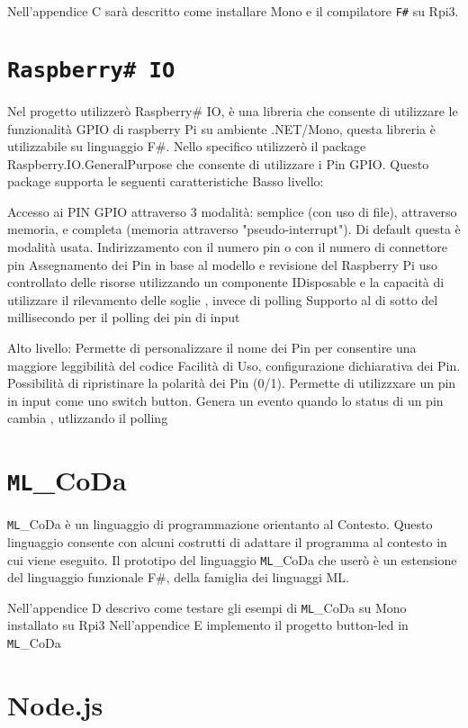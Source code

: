 Nell'appendice C sarà  descritto come installare Mono e il compilatore \texttt{F\#} su Rpi3.

\section{\texttt{Raspberry\# IO}}
Nel progetto utilizzerò Raspberry# IO, è una libreria che consente di utilizzare le funzionalità GPIO di raspberry Pi su ambiente .NET/Mono, questa libreria è utilizzabile su linguaggio F#.
Nello specifico utilizzerò il package Raspberry.IO.GeneralPurpose che consente di utilizzare i Pin GPIO.
Questo package supporta le seguenti caratteristiche
Basso livello:

Accesso ai PIN GPIO attraverso 3 modalità: 
semplice (con uso di file), 
attraverso memoria, e 
completa (memoria attraverso "pseudo-interrupt"). Di default questa è modalità usata.
	Indirizzamento con il numero pin o con il numero di connettore pin
	Assegnamento dei Pin in base al modello e revisione del Raspberry Pi
	uso controllato delle risorse utilizzando un componente IDisposable e la capacità di utilizzare il rilevamento delle soglie , invece di polling
	Supporto al di sotto del millisecondo per il polling dei pin di input

Alto livello:
	Permette di personalizzare il nome dei Pin per consentire una maggiore leggibilità del codice
	Facilità di Uso, configurazione dichiarativa  dei Pin. Possibilità di ripristinare la polarità dei Pin (0/1). Permette di utilizzxare un pin in input come uno switch button.  
	Genera un evento quando lo status di un pin cambia , utlizzando il polling


\section{\texttt{ML}_{CoDa}}
 \texttt{ML}_{CoDa} è un linguaggio di programmazione orientanto al Contesto. Questo linguaggio consente con alcuni costrutti di adattare il programma al contesto in cui viene eseguito. Il prototipo del linguaggio \texttt{ML}_{CoDa} che userò è un estensione del linguaggio funzionale F#, della famiglia dei linguaggi ML.
 
 
 Nell'appendice D descrivo come testare gli esempi di \texttt{ML}_{CoDa} su Mono installato su Rpi3
 Nell'appendice E implemento il progetto button-led in \texttt{ML}_{CoDa} 
\section{Node.js}

